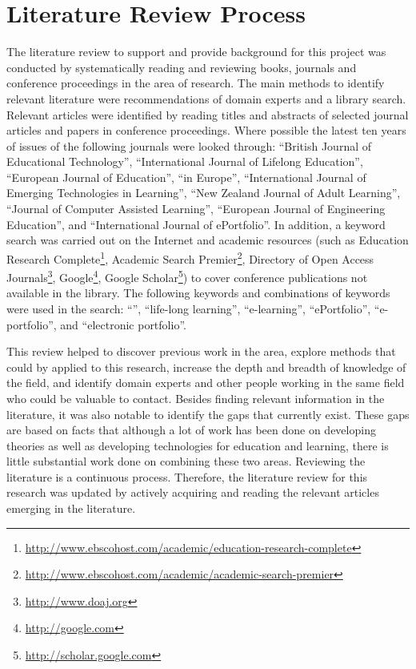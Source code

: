 \section{Literature Review Process}
The literature review to support and provide background for this project was
conducted by systematically reading and reviewing books, journals and conference
proceedings in the area of research. The main methods to identify relevant
literature were recommendations of domain experts and a library search. Relevant
articles were identified by reading titles and abstracts of selected journal
articles and papers in conference proceedings. Where possible the latest ten
years of issues of the following journals were looked through: ``British Journal
of Educational Technology'', ``International Journal of Lifelong Education'',
``European Journal of Education'', ``\LLLc in Europe'', ``International Journal
of Emerging Technologies in Learning'', ``New Zealand Journal of Adult
Learning'', ``Journal of Computer Assisted Learning'', ``European Journal of
Engineering Education'', and ``International Journal of ePortfolio''. In
addition, a keyword search was carried out on the Internet and academic
resources (such as Education Research
Complete\footnote{\url{http://www.ebscohost.com/academic/education-research-complete}},
Academic Search
Premier\footnote{\url{http://www.ebscohost.com/academic/academic-search-premier}},
Directory of Open Access Journals\footnote{\url{http://www.doaj.org}},
Google\footnote{\url{http://google.com}}, Google
Scholar\footnote{\url{http://scholar.google.com}}) to cover conference
publications not available in the library. The following keywords and
combinations of keywords were used in the search: ``\LLLsn'', ``life-long
learning'', ``e-learning'', ``ePortfolio'', ``e-portfolio'', and ``electronic
portfolio''.

This review helped to discover previous work in the area, explore methods
that could by applied to this research, increase the depth and breadth of
knowledge of the field, and identify domain experts and other people working
in the same field who could be valuable to contact. Besides finding relevant
information in the literature, it was also notable to identify the gaps that
currently exist. These gaps are based on facts that although a lot of work has
been done on developing \LLLs theories as well as developing technologies for
education and learning, there is little substantial work done on combining
these two areas. Reviewing the literature is a continuous process. Therefore,
the literature review for this research was updated by actively acquiring and
reading the relevant articles emerging in the literature.

